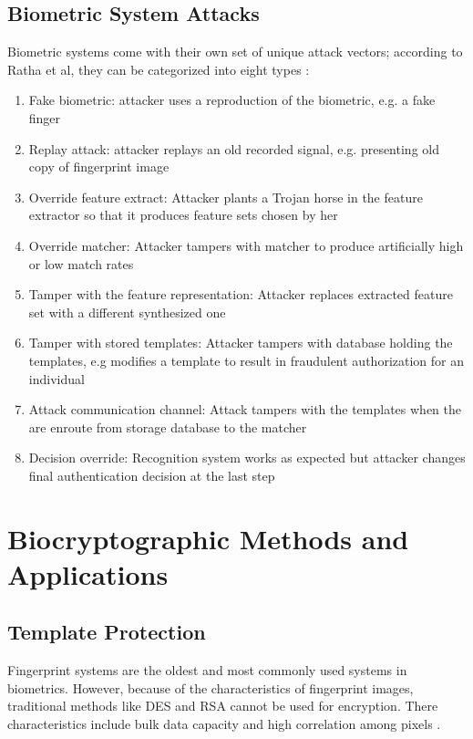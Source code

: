 \documentclass[11pt]{article}
\begin{document}
\subsection{Biometric System Attacks}
Biometric systems come with their own set of unique attack vectors; according
to Ratha et al, they can be categorized into eight types \cite{Ratha01ananalysis}:
        \begin{enumerate}[1., topsep=0pt]
    \singlespace
        \item Fake biometric: attacker uses a reproduction of the biometric, e.g. a fake finger
        \item Replay attack: attacker replays an old recorded signal, e.g. presenting old copy of fingerprint image
        \item Override feature extract: Attacker plants a Trojan horse in 
        the feature extractor so that it produces feature sets chosen by her
        \item Override matcher: Attacker tampers with matcher to produce
        artificially high or low match rates
        \item Tamper with the feature representation: Attacker replaces
        extracted feature set with a different synthesized one
        \item Tamper with stored templates: Attacker tampers with database
        holding the templates, e.g modifies a template to result in fraudulent 
        authorization for an individual 
        \item Attack communication channel: Attack tampers with the templates 
        when the are enroute from storage database to the matcher
        \item Decision override: Recognition system works as expected but
        attacker changes final authentication decision at the last step 
        \end{enumerate}
    \doublespace

\section{Biocryptographic Methods and Applications}

\subsection{Template Protection}
Fingerprint systems are the oldest and most commonly used systems in biometrics.
However, because of the characteristics of fingerprint images, traditional 
methods like DES and RSA cannot be used for encryption. There 
characteristics include bulk data capacity and high correlation among 
pixels \cite{Fingerprint07}.
\end{document}
